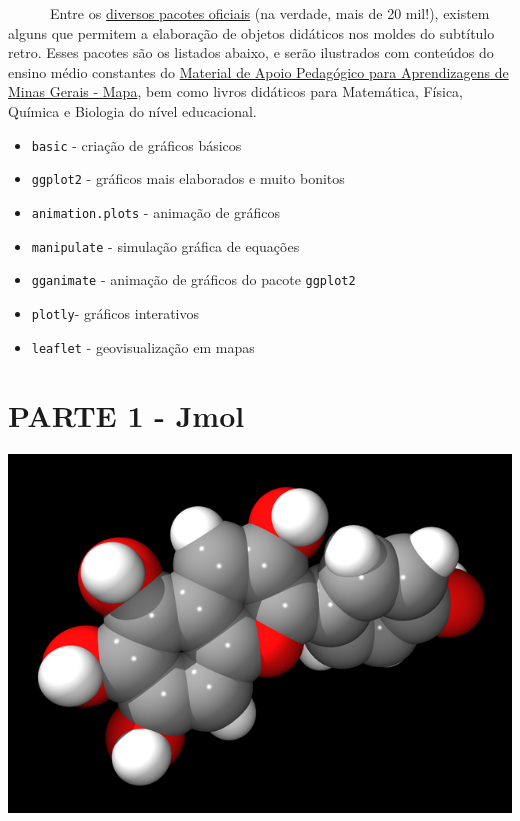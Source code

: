 \documentclass[
  letterpaper,
  DIV=11,
  numbers=noendperiod]{scrreprt}
\providecommand{\tightlist}{%
  \setlength{\itemsep}{0pt}\setlength{\parskip}{0pt}}\usepackage{longtable,booktabs,array}
\begin{document}
~~~~~~Entre os
\href{https://cran.r-project.org/web/packages/available_packages_by_name.html}{diversos
pacotes oficiais} (na verdade, mais de 20 mil!), existem alguns que
permitem a elaboração de objetos didáticos nos moldes do subtítulo
retro. Esses pacotes são os listados abaixo, e serão ilustrados com
conteúdos do ensino médio constantes do
\href{https://seliga.educacao.mg.gov.br/cardenos-mapa}{Material de Apoio
Pedagógico para Aprendizagens de Minas Gerais - Mapa}, bem como livros
didáticos para Matemática, Física, Química e Biologia do nível
educacional.

\begin{itemize}
\tightlist
\item
  \texttt{basic} - criação de gráficos básicos
\item
  \texttt{ggplot2} - gráficos mais elaborados e muito bonitos
\item
  \texttt{animation.plots} - animação de gráficos
\item
  \texttt{manipulate} - simulação gráfica de equações
\item
  \texttt{gganimate} - animação de gráficos do pacote \texttt{ggplot2}
\item
  \texttt{plotly}- gráficos interativos
\item
  \texttt{leaflet} - geovisualização em mapas
\end{itemize}

\part{PARTE 1 - Jmol}

\includegraphics{jmolPart.png}
\end{document}
